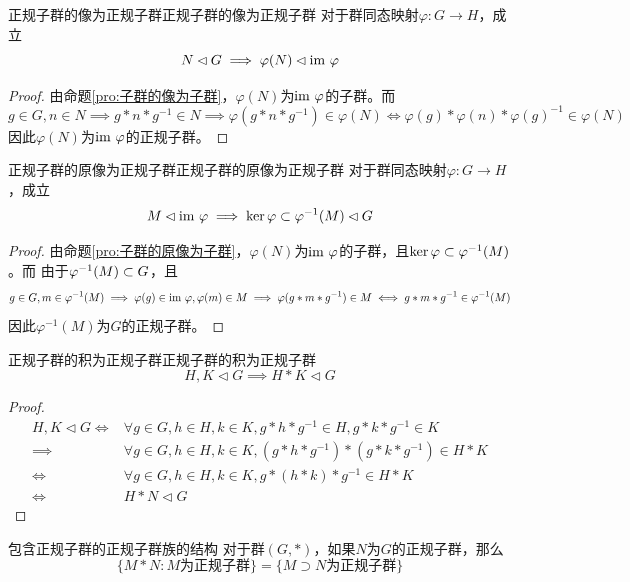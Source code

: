 \begin{proposition}{正规子群的像为正规子群}{正规子群的像为正规子群}
	对于群同态映射$\varphi:G\to H$，成立
	$$
	N\lhd G\implies \varphi(N)\lhd \text{im } \varphi
	$$
\end{proposition}

\begin{proof}
	由命题\ref{pro:子群的像为子群}，$\varphi(N)$为$\text{im } \varphi$的子群。而
	$$
	g\in G,n\in N\implies g*n*g^{-1}\in N\implies \varphi(g*n*g^{-1})\in\varphi(N)\iff \varphi(g)*\varphi(n)*\varphi(g)^{-1}\in\varphi(N)
	$$
	因此$\varphi(N)$为$\text{im } \varphi$的正规子群。
\end{proof}

\begin{proposition}{正规子群的原像为正规子群}{正规子群的原像为正规子群}
	对于群同态映射$\varphi:G\to H$，成立
	$$
	M\lhd \text{im } \varphi\implies \ker\varphi\subset \varphi^{-1}(M)\lhd G
	$$
\end{proposition}

\begin{proof}
	由命题\ref{pro:子群的原像为子群}，$\varphi(N)$为$\text{im } \varphi$的子群，且$\ker\varphi\subset \varphi^{-1}(M)$。而
	由于$\varphi^{-1}(M)\subset G$，且
	$$
	g\in G,m\in\varphi^{-1}(M)\implies 
	\varphi(g)\in \text{im } \varphi,\varphi(m)\in M\implies
	\varphi(g*m*g^{-1})\in M
	\iff g*m*g^{-1}\in\varphi^{-1}(M)
	$$
	因此$\varphi^{-1}(M)$为$G$的正规子群。
\end{proof}

\begin{proposition}{正规子群的积为正规子群}{正规子群的积为正规子群}
	$$
	H,K\lhd G\implies H*K\lhd G
	$$
\end{proposition}

\begin{proof}
	\begin{align*}
		H,K\lhd G
		\iff & \forall g\in G,h\in H,k\in K,g*h*g^{-1}\in H,g*k*g^{-1}\in K\\
		\implies & \forall g\in G,h\in H,k\in K,(g*h*g^{-1})*(g*k*g^{-1})\in H*K\\
		\iff & \forall g\in G,h\in H,k\in K,g*(h*k)*g^{-1}\in H*K\\
		\iff & H*N\lhd G
	\end{align*}
\end{proof}

\begin{proposition}{}{包含正规子群的正规子群族的结构}
	对于群$(G,*)$，如果$N$为$G$的正规子群，那么
	$$
	\{ M*N:M\text{为正规子群} \}=\{ M\supset N\text{为正规子群}\}
	$$
\end{proposition}

